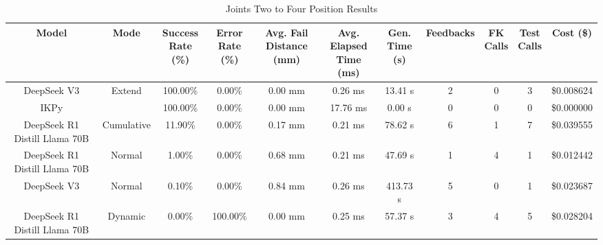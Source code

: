 \begin{table}[H]
\tiny
\renewcommand{\arraystretch}{1.2}
\caption{Joints Two to Four Position Results}
\begin{center}
\begin{tabular}{|c|c|c|c|c|c|c|c|c|c|c|}
    \hline
    \textbf{Model} & 
    \textbf{Mode} & 
    \makecell{\textbf{Success}\\\textbf{Rate (\%)}} &
    \makecell{\textbf{Error}\\\textbf{Rate (\%)}} &
    \makecell{\textbf{Avg. Fail}\\\textbf{Distance (mm)}} &
    \makecell{\textbf{Avg. Elapsed}\\\textbf{Time (ms)}} &
    \makecell{\textbf{Gen.}\\\textbf{Time (s)}} &
    \textbf{Feedbacks} &
    \makecell{\textbf{FK}\\\textbf{Calls}} &
    \makecell{\textbf{Test}\\\textbf{Calls}} &
    \textbf{Cost (\$)} \\
    \hline
    DeepSeek V3 & Extend & 100.00\% & 0.00\% & 0.00 mm & 0.26 ms & 13.41 s & 2 & 0 & 3 & \$0.008624 \\
    \hline
    IKPy &  & 100.00\% & 0.00\% & 0.00 mm & 17.76 ms & 0.00 s & 0 & 0 & 0 & \$0.000000 \\
    \hline
    DeepSeek R1 Distill Llama 70B & Cumulative & 11.90\% & 0.00\% & 0.17 mm & 0.21 ms & 78.62 s & 6 & 1 & 7 & \$0.039555 \\
    \hline
    DeepSeek R1 Distill Llama 70B & Normal & 1.00\% & 0.00\% & 0.68 mm & 0.21 ms & 47.69 s & 1 & 4 & 1 & \$0.012442 \\
    \hline
    DeepSeek V3 & Normal & 0.10\% & 0.00\% & 0.84 mm & 0.26 ms & 413.73 s & 5 & 0 & 1 & \$0.023687 \\
    \hline
    DeepSeek R1 Distill Llama 70B & Dynamic & 0.00\% & 100.00\% & 0.00 mm & 0.25 ms & 57.37 s & 3 & 4 & 5 & \$0.028204 \\
    \hline
\end{tabular}
\label{Results-Position-2-4}
\end{center}
\end{table}

